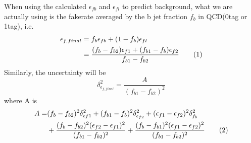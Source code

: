 \documentclass{article}
\newcommand\numberthis{\addtocounter{equation}{1}\tag{\theequation}}
\begin{document}
\begin{flushleft}
\vspace{5mm}

When using the calculated $\epsilon_{fb}$ and $\epsilon_{fl}$  to predict background, what we are actually using is the fakerate averaged by the b jet fraction $f_b$ in QCD(0tag or 1tag), i.e.
\begin{align*}
\epsilon_{f,final} &= f_{b}\epsilon_{fb}+(1-f_{b})\epsilon_{fl}\\
                            &=\frac{(f_{b}-f_{b2})\epsilon_{f1}+(f_{b1}-f_{b})\epsilon_{f2}}{f_{b1}-f_{b2}}\numberthis
\end{align*}
Similarly, the uncertainty will be
\begin{equation}
\delta^2_{\epsilon_{f,final}}=\frac{A}{(f_{b1}-f_{b2})^2}
\end{equation}
where A is
\begin{align*}
A=&(f_{b}-f_{b2})^2\delta^2_{\epsilon{f1}}+(f_{b1}-f_{b})^2\delta^2_{\epsilon_{f2}}+(\epsilon_{f1}-\epsilon_{f2})^2\delta^2_{f_{b}}\\
     &+\frac{(f_{b}-f_{b2})^2(\epsilon_{f2}-\epsilon_{f1})^2}{(f_{b1}-f_{b2})^2}+\frac{(f_{b}-f_{b1})^2(\epsilon_{f1}-\epsilon_{f2})^2}{(f_{b1}-f_{b2})^2} \numberthis
\end{align*}

\end{flushleft}
\end{document}
